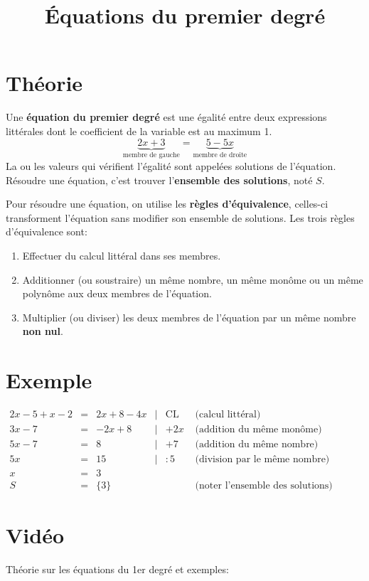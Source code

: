 \documentclass[a4paper,11pt]{article}
\begin{document}
\title{Équations du premier degré}
\date{}
\maketitle

\section{Théorie}
Une \textbf{équation du premier degré} est une égalité entre deux expressions littérales dont le coefficient de la variable est au maximum 1.
$$\underbrace{2x + 3}_{\text{membre de gauche}} = \underbrace{5 - 5x}_{\text{membre de droite}}$$
La ou les valeurs qui vérifient l'égalité sont appelées solutions de l'équation. Résoudre une équation, c'est trouver l'\textbf{ensemble des solutions}, noté $S$.

Pour résoudre une équation, on utilise les \textbf{règles d'équivalence}, celles-ci transforment l'équation sans modifier son ensemble de solutions. Les trois règles d'équivalence sont:
\begin{enumerate}[label*=\arabic*.]
\item Effectuer du calcul littéral dans ses membres.
\item Additionner (ou soustraire) un même nombre, un même monôme ou un même polynôme aux deux membres de l'équation.
\item Multiplier (ou diviser) les deux membres de l'équation par un même nombre \textbf{non nul}.
\end{enumerate}

\section{Exemple}
$\begin{array}{rclrll}
2x-5+x-2 &=&2x+8-4x &|& \text{CL} & \text{ (calcul littéral)} \\
3x-7 &=&-2x+8 &|& +2x & \text{ (addition du même monôme)} \\
5x-7 &=& 8 &|& +7 &  \text{ (addition du même nombre)}\\
5x &=& 15 &|& :5 & \text{ (division par le même nombre)}\\
x &=& 3 &&&\\
S &=& \{3\} &&& \text{ (noter l'ensemble des solutions)}
\end{array}$

\section{Vidéo}
Théorie sur les équations du 1er degré et exemples:\par
{}
\end{document}
